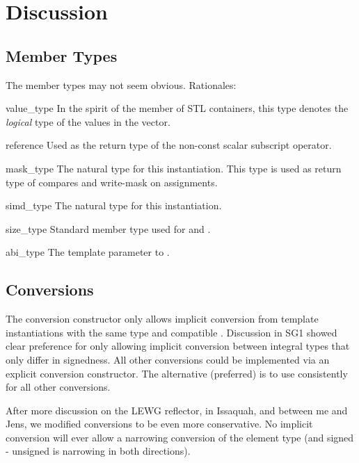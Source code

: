 \section{Discussion}

\subsection{Member Types}
The member types may not seem obvious.
Rationales:
\begin{typelist*}
  \item[value_type]
    In the spirit of the  member of STL containers, this type denotes the \emph{logical} type of the values in the vector.

  \item[reference]
    Used as the return type of the non-const scalar subscript operator.

  \item[mask_type]
    The natural \mask type for this \simd instantiation.
    This type is used as return type of compares and write-mask on assignments.

  \item[simd_type]
    The natural \simd type for this \mask instantiation.

  \item[size_type]
    Standard member type used for  and .

  \item[abi_type]
    The  template parameter to \simd.

\end{typelist*}

\subsection{Conversions}
The \simd conversion constructor only allows implicit conversion from \simd template instantiations with the same  type and compatible .
Discussion in SG1 showed clear preference for only allowing implicit conversion between integral types that only differ in signedness.
All other conversions could be implemented via an explicit conversion constructor.
The alternative (preferred) is to use \simdcast consistently for all other conversions.

After more discussion on the LEWG reflector, in Issaquah, and between me and Jens, we modified conversions to be even more conservative.
No implicit conversion will ever allow a narrowing conversion of the element type (and signed - unsigned is narrowing in both directions).

